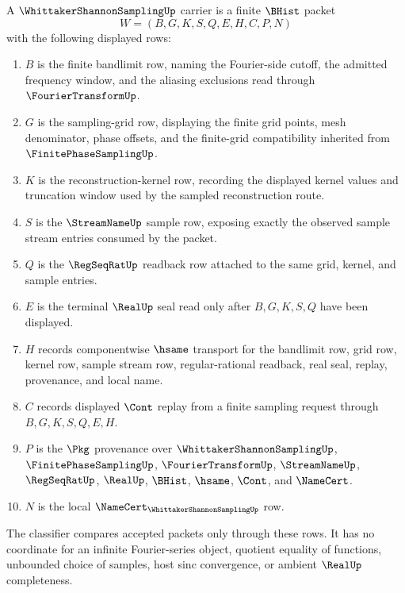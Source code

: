 \begin{definition}
\label{def:whittaker-shannon-sampling-carrier}
A $\WhittakerShannonSamplingUp$ carrier is a finite $\BHist$ packet
$$
W=(B,G,K,S,Q,E,H,C,P,N)
$$
with the following displayed rows:
\begin{enumerate}
\item $B$ is the finite bandlimit row, naming the Fourier-side cutoff, the admitted frequency window, and the aliasing exclusions read through $\FourierTransformUp$.
\item $G$ is the sampling-grid row, displaying the finite grid points, mesh denominator, phase offsets, and the finite-grid compatibility inherited from $\FinitePhaseSamplingUp$.
\item $K$ is the reconstruction-kernel row, recording the displayed kernel values and truncation window used by the sampled reconstruction route.
\item $S$ is the $\StreamNameUp$ sample row, exposing exactly the observed sample stream entries consumed by the packet.
\item $Q$ is the $\RegSeqRatUp$ readback row attached to the same grid, kernel, and sample entries.
\item $E$ is the terminal $\RealUp$ seal read only after $B,G,K,S,Q$ have been displayed.
\item $H$ records componentwise $\hsame$ transport for the bandlimit row, grid row, kernel row, sample stream row, regular-rational readback, real seal, replay, provenance, and local name.
\item $C$ records displayed $\Cont$ replay from a finite sampling request through $B,G,K,S,Q,E,H$.
\item $P$ is the $\Pkg$ provenance over $\WhittakerShannonSamplingUp$, $\FinitePhaseSamplingUp$, $\FourierTransformUp$, $\StreamNameUp$, $\RegSeqRatUp$, $\RealUp$, $\BHist$, $\hsame$, $\Cont$, and $\NameCert$.
\item $N$ is the local $\NameCert_{\WhittakerShannonSamplingUp}$ row.
\end{enumerate}
The classifier compares accepted packets only through these rows. It has no coordinate for an infinite Fourier-series object, quotient equality of functions, unbounded choice of samples, host sinc convergence, or ambient $\RealUp$ completeness.
\end{definition}

